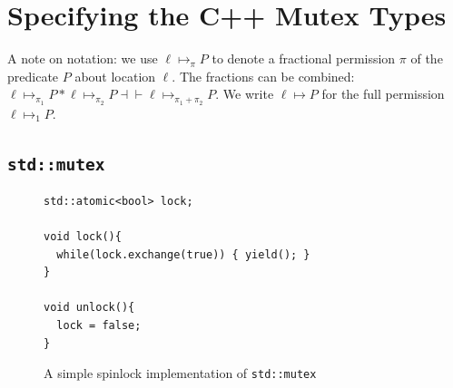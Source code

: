 \section{Specifying the C++ Mutex Types}
A note on notation: we use $\ell \mapsto_{\pi} P$ to denote a fractional permission $\pi$ of the
predicate $P$ about location $\ell$. The fractions can be combined:
$\ell \mapsto_{\pi_1} P \ast \ell \mapsto_{\pi_2} P \dashv\vdash \ell \mapsto_{\pi_1 + \pi_2} P$.
We write $\ell \mapsto P$ for the full permission $\ell \mapsto_{1} P$.

\newcommand{\spectriple}[3]{%
  \begingroup
  \setlength{\fboxsep}{1.2pt}%
  \setlength{\fboxrule}{0.3pt}%
  \boxed{\begin{gathered}
    \left\{\,#1\,\right\} \\[-1pt]
    #2 \\[-1pt]
    \left\{\,#3\,\right\}
  \end{gathered}}%
  \endgroup}

\renewcommand{\MathparLineskip}{\lineskiplimit=.55em\lineskip=.55em plus .1em}

\newcommand{\mutextoken}[2]{\ensuremath{\mathsf{token}(#1, #2)}}
\newcommand{\usedthreads}[2]{\ensuremath{\allusers_{#1}(#2)}}
\newcommand{\notlocked}[3]{\ensuremath{\mathsf{not\_locked}_{#1}(#2, #3)}}
\newcommand{\locked}[3]{\ensuremath{\mathsf{m\_locked}_{#1}(#2, #3)}}
\newcommand{\smlocked}[3]{\ensuremath{\mathsf{sm\_locked}_{#1}(#2, #3)}}
\newcommand{\rmlocked}[2]{\ensuremath{\mathsf{rm\_locked}_{#1}(#2)}}
\newcommand{\mutex}[2]{\ensuremath{\mathsf{mutex}_{#1}(#2)}}
\newcommand{\acquirable}[6]{\ensuremath{\mathsf{holds}_{#1}(#2, #3, #4, #5, #6)}}
\newcommand{\rmutex}[2]{\ensuremath{\mathsf{rmutex}_{#1}(#2)}}
\newcommand{\smreaderlocked}[4]{\ensuremath{\mathsf{sm\_reader\_locked}_{#1}(#2, #3, #4)}}
\newcommand{\smutex}[2]{\ensuremath{\mathsf{smutex}_{#1}(#2)}}
\newcommand{\token}[2]{\ensuremath{\mathsf{token}_{#1}(#2)}}
\newcommand{\mutexperm}[2]{\ensuremath{\mathsf{mutex\_perm}_{#1}(#2)}}
\newcommand{\mutexname}[1]{\ensuremath{#1}}

\subsection{\texorpdfstring{\lstinline{std::mutex}}{std::mutex}}
\label{mutex-spec}

\begin{figure}[htb]
\begin{lstlisting}
std::atomic<bool> lock;

void lock(){
  while(lock.exchange(true)) { yield(); }
}

void unlock(){
  lock = false;
}
\end{lstlisting}
\caption{A simple spinlock implementation of \lstinline{std::mutex}}
\label{mutex-simple}
\end{figure}

